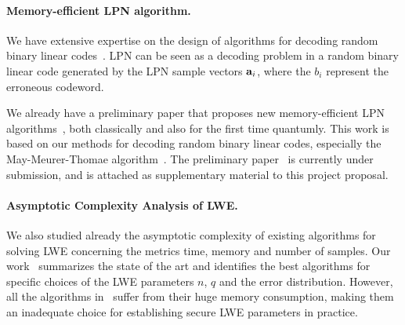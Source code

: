 
\paragraph{Memory-efficient LPN algorithm.} We have extensive expertise on the design of algorithms for decoding random binary linear codes~\cite{Codes11,Codes12,Codes15}. LPN  can be seen as a decoding problem in a random binary linear code generated by the LPN sample vectors $\mathbf a_i$, where the $b_i$ represent the erroneous codeword. %

We already have a preliminary paper that proposes new memory-efficient LPN algorithms~\cite{LPN}, both classically and also for the first time quantumly.  This work is based on our methods for decoding random binary linear codes, especially the May-Meurer-Thomae algorithm~\cite{Codes11}. The preliminary paper~\cite{LPN} is currently under submission, and is attached as supplementary material to this project proposal.

\paragraph{Asymptotic Complexity Analysis of LWE.} We also studied already the asymptotic complexity of existing algorithms for solving LWE concerning the metrics time, memory and number of samples. Our work~\cite{LWE} summarizes the state of the art and identifies the best algorithms for specific choices of the LWE parameters $n$, $q$ and the error distribution. However, all the algorithms in~\cite{LWE} suffer from their huge memory consumption, making them an inadequate choice for establishing secure LWE parameters in practice.